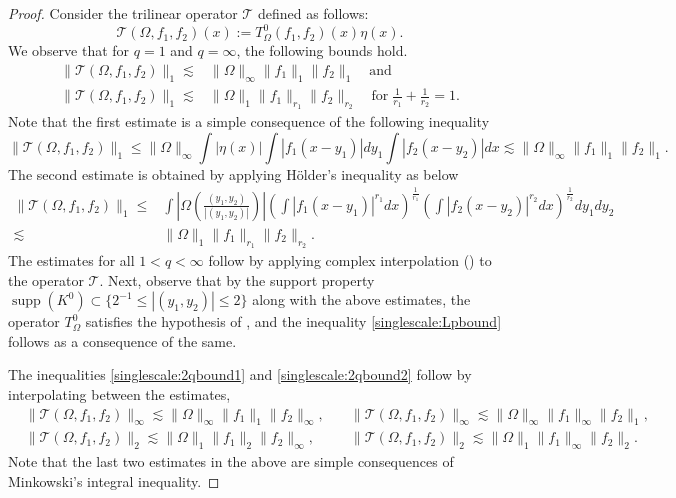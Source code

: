 \documentclass[a4paper,reqno]{amsart}
\newcommand{\supp}[1]{\operatorname{supp}(#1)}   %
\theoremstyle{definition}
\numberwithin{equation}{section}
\begin{document}
\begin{proof}
	Consider the trilinear operator $\mathcal{T}$ defined as follows:
	\[\mathcal{T}(\Omega,f_1,f_2)(x):=T^0_\Omega(f_1,f_2)(x)\eta(x).\]
	We observe that for $q=1$ and $q=\infty$, the following bounds hold. 
	\begin{align*}
		\|\mathcal{T}(\Omega,f_1,f_2)\|_1\lesssim&\|\Omega\|_\infty\|f_1\|_1\|f_2\|_1\quad\text{and}\\
		\|\mathcal{T}(\Omega,f_1,f_2)\|_1\lesssim&\|\Omega\|_1\|f_1\|_{r_1}\|f_2\|_{r_2}\quad\text{for}\;\frac{1}{r_1}+\frac{1}{r_2}=1.
	\end{align*}
	Note that the first estimate is a simple consequence of the following inequality 
	\[\|\mathcal{T}(\Omega,f_1,f_2)\|_1\leq\|\Omega\|_\infty\int|\eta(x)|\int |f_1(x-y_1)|dy_1\int |f_2(x-y_2)|dx\lesssim\|\Omega\|_\infty\|f_1\|_1\|f_2\|_1.\]
	The second estimate is obtained by applying H\"{o}lder's inequality as below
	\begin{align*}
		\|\mathcal{T}(\Omega,f_1,f_2)\|_1\leq&\int\left|\Omega\left(\frac{(y_1,y_2)}{|(y_1,y_2)|}\right)\right|\left(\int |f_1(x-y_1)|^{r_1}dx\right)^\frac{1}{r_1}\left(\int |f_2(x-y_2)|^{r_2}dx\right)^\frac{1}{r_2}dy_1dy_2\\
		\lesssim&\|\Omega\|_1\|f_1\|_{r_1}\|f_2\|_{r_2}.
	\end{align*}
	The estimates for all $1<q<\infty$ follow by applying complex interpolation () to the operator $\mathcal{T}$.
	Next, observe that by the support property $\supp{K^0}\subset\{2^{-1}\leq|(y_1,y_2)|\leq2\}$ along with the above estimates, the operator $T^0_\Omega$ satisfies the hypothesis of , and the inequality \eqref{singlescale:Lpbound} follows as a consequence of the same. 

	The inequalities \eqref{singlescale:2qbound1} and \eqref{singlescale:2qbound2} follow by interpolating between the estimates,
	\begin{eqnarray*}
		&\|\mathcal{T}(\Omega,f_1,f_2)\|_\infty\lesssim\|\Omega\|_\infty\|f_1\|_1\|f_2\|_\infty,\quad&\|\mathcal{T}(\Omega,f_1,f_2)\|_\infty\lesssim\|\Omega\|_\infty\|f_1\|_\infty\|f_2\|_1,\\
		&\|\mathcal{T}(\Omega,f_1,f_2)\|_2\lesssim\|\Omega\|_1\|f_1\|_2\|f_2\|_\infty,\quad&\|\mathcal{T}(\Omega,f_1,f_2)\|_2\lesssim\|\Omega\|_1\|f_1\|_\infty\|f_2\|_2.
	\end{eqnarray*}
	Note that the last two estimates in the above are simple consequences of Minkowski's integral inequality.
\end{proof}
\end{document}

